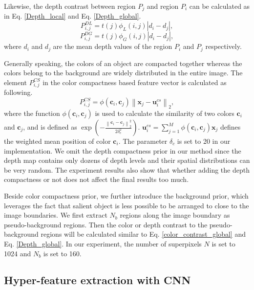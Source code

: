 \documentclass[journal]{IEEEtran}
\begin{document}
Likewise, the depth contrast between region $P_j$ and region $P_i$ can be calculated as in Eq. \ref{Depth_local} and Eq. \ref{Depth_global}.
\begin{equation}\label{Depth_local}
  P_{i,j}^{DL} = t({{j}}){\phi _L}({i},{j})\left| {{{d}_i} - {{d}_j}} \right|,
\end{equation}
\begin{equation}\label{Depth_global}
  P_{i,j}^{DG} = t(j){\phi _G}({i},{j})\left| {{{d}_i} - {{d}_j}} \right|,
\end{equation}
where ${d_{i}}$ and ${d_{j}}$ are the mean depth values of the region $P_i$ and $P_j$ respectively.

Generally speaking, the colors of an object are compacted together whereas the colors belong to the background are widely distributed in the entire image. The element ${P_{i,j}^{CS}}$ in the color compactness based feature vector is calculated as following.
\begin{equation}\label{col_spatial}
  {P_{i,j}^{CS}} =  {\phi ({\bm{c}_{i}},{\bm{c}_{j}})\left\| {{\bm{x}_j} - \bm{u}_i^{cs}} \right\|_2},
\end{equation}
where the function $\phi(\bm{c}_{i},\bm{c}_{j})$ is used to calculate the similarity of two colors $\bm{c}_{i}$ and $\bm{c}_{j}$, and is defined as $\exp ( - \frac{{\left\| {{\bm{c}_{i}} - {\bm{c}_{j}}} \right\|_2^2}}{{2\delta _c^2}})$. $\bm{u}_i^{cs} = \sum\limits_{j = 1}^M {\phi ({\bm{c}_{i}},{\bm{c}_{j}})} {\bm{x}_j}$ defines the weighted mean position of color $\bm{c}_{i}$. The parameter $\delta _c$ is set to 20 in our implementation. We omit the depth compactness prior in our method since the depth map contains only dozens of depth levels and their spatial distributions can be very random. The experiment results also show that whether adding the depth compactness or not does not affect the final results too much.

Beside color compactness prior, we further introduce the background prior, which leverages the fact that salient object is less possible to be arranged to close to the image boundaries. We first extract $N_b$ regions along the image boundary as pseudo-background regions. Then the color or depth contrast to the pseudo-background regions will be calculated similar to Eq. \ref{color_contrast_global} and Eq. \ref{Depth_global}. In our experiment, the number of superpixels $N$ is set to 1024 and $N_b$ is set to 160.

\subsection{Hyper-feature extraction with CNN}\label{title_3_2}
\end{document}
